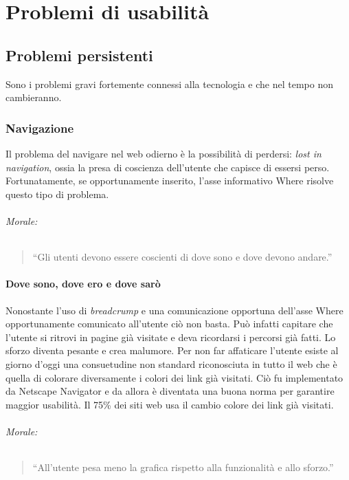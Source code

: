 
\chapter{Problemi di usabilità}

	\section{Problemi persistenti}
		Sono i problemi gravi fortemente connessi alla tecnologia e che nel tempo non cambieranno.
	
		\subsection{Navigazione}
			Il problema del navigare nel web odierno è la possibilità di perdersi: \emph{lost in navigation}, ossia la presa di coscienza dell'utente che capisce di essersi perso. Fortunatamente, se opportunamente inserito, l'asse informativo Where risolve questo tipo di problema.
			\subparagraph*{Morale:}
			\begin{quote}
				``Gli utenti devono essere coscienti di dove sono e dove devono andare.''
			\end{quote}
			
			\subsubsection{Dove sono, dove ero e dove sarò}
				Nonostante l'uso di \emph{breadcrump} e una comunicazione opportuna dell'asse Where opportunamente comunicato all'utente ciò non basta. Può infatti capitare che l'utente si ritrovi in pagine già visitate e deva ricordarsi i percorsi già fatti. Lo sforzo diventa pesante e crea malumore. Per non far affaticare l'utente esiste al giorno d'oggi una consuetudine non standard riconosciuta in tutto il web che è quella di colorare diversamente i colori dei link già visitati. Ciò fu implementato da Netscape Navigator e da allora è diventata una buona norma per garantire maggior usabilità.
				Il 75\% dei siti web usa il cambio colore dei link già visitati.
			\subparagraph*{Morale:}
			\begin{quote}
				``All'utente pesa meno la grafica rispetto alla funzionalità e allo sforzo.''
			\end{quote}	
			
